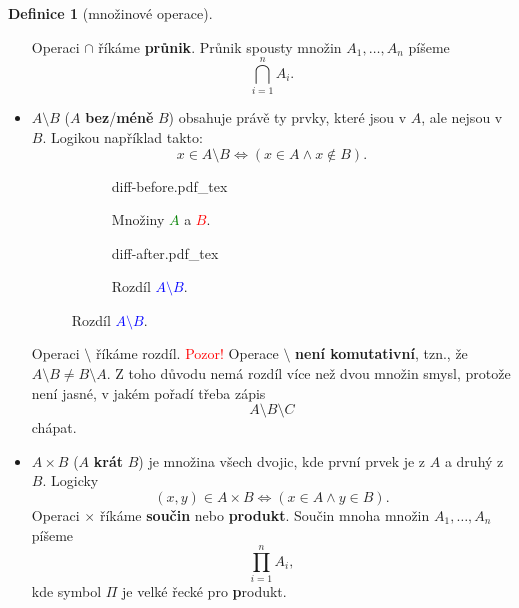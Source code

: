 \documentclass[a4paper,11pt]{article}
\theoremstyle{definition}
\newtheorem{dfn}[thm]{Definice}
\begin{document}
\begin{dfn}[množinové operace]
\begin{itemize}
\begin{center}
   \end{center}
   \vspace*{-8mm}
   Operaci $ \cap $ říkáme \textbf{průnik}. Průnik spousty množin
   $A_1,\ldots,A_n$ píšeme
   \[
    \bigcap_{i=1}^{n} A_i.
   \]
  \item $A \setminus B$ ($A$ \textbf{bez}/\textbf{méně} $B$) obsahuje právě ty
   prvky, které jsou v $A$, ale nejsou v $B$. Logikou například takto:
   \[
    x \in A \setminus B \Leftrightarrow (x \in A \wedge x \notin B).
   \]
   \begin{center}
    \begin{figure}[h]
     \centering
     \begin{subfigure}{0.45\textwidth}
      \centering
      \def\svgwidth{0.6\textwidth}
      {diff-before.pdf_tex}
      \caption*{Množiny \textcolor{green}{$A$} a \textcolor{red}{$B$}.}
     \end{subfigure}
     \begin{subfigure}{0.45\textwidth}
      \centering
      \def\svgwidth{0.6\textwidth}
      {diff-after.pdf_tex}
      \caption*{Rozdíl \textcolor{blue}{$A \setminus B$}.}
     \end{subfigure}
    \end{figure}
   \end{center}
   \vspace*{-8mm}
   Operaci $ \setminus $ říkáme rozdíl. \textcolor{red}{Pozor!} Operace $
   \setminus $ \textbf{není komutativní}, tzn., že $A \setminus B \neq B
   \setminus A$. Z toho důvodu nemá rozdíl více než dvou množin smysl, protože
   není jasné, v jakém pořadí třeba zápis
   \[
    A \setminus B \setminus C
   \]
   chápat.
  \item $A \times B$ ($A$ \textbf{krát} $B$) je množina všech dvojic, kde první
   prvek je z $A$ a druhý z $B$. Logicky
   \[
    (x,y) \in A \times B \Leftrightarrow (x \in A \wedge y \in B).
   \]
   Operaci $ \times $ říkáme \textbf{součin} nebo \textbf{produkt}. Součin mnoha
   množin $A_1,\ldots,A_n$ píšeme
   \[
    \prod_{i=1}^{n} A_i,
   \]
   kde symbol $\Pi$ je velké řecké  pro \textbf{p}rodukt.
 \end{itemize}
\end{dfn}
\end{document}
